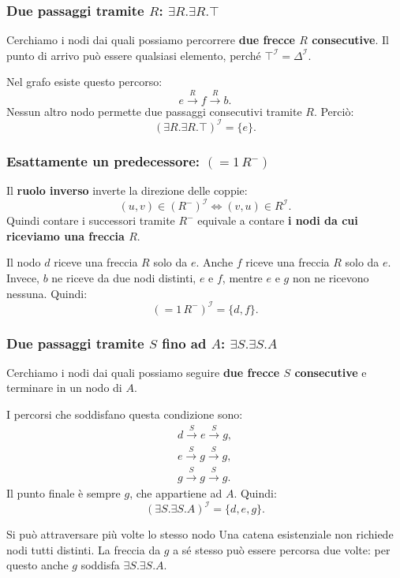 \subsubsection{Due passaggi tramite \(R\): \(\exists R.\exists R.\top\)}

Cerchiamo i nodi dai quali possiamo percorrere \textbf{due frecce \(R\)
consecutive}. Il punto di arrivo può essere qualsiasi elemento, perché
\(\top^{\mathcal I}=\Delta^{\mathcal I}\).

Nel grafo esiste questo percorso:
\[
    e\xrightarrow{R}f\xrightarrow{R}b.
\]
Nessun altro nodo permette due passaggi consecutivi tramite \(R\). Perciò:
\[
    (\exists R.\exists R.\top)^{\mathcal I}=\{e\}.
\]

\subsubsection{Esattamente un predecessore: \((=1\,R^{-})\)}

Il \textbf{ruolo inverso} inverte la direzione delle coppie:
\[
    (u,v)\in(R^{-})^{\mathcal I}\iff(v,u)\in R^{\mathcal I}.
\]
Quindi contare i successori tramite \(R^{-}\) equivale a contare
\textbf{i nodi da cui riceviamo una freccia \(R\)}.

Il nodo \(d\) riceve una freccia \(R\) solo da \(e\). Anche \(f\) riceve
una freccia \(R\) solo da \(e\). Invece, \(b\) ne riceve da due nodi
distinti, \(e\) e \(f\), mentre \(e\) e \(g\) non ne ricevono nessuna.
Quindi:
\[
    (=1\,R^{-})^{\mathcal I}=\{d,f\}.
\]

\subsubsection{Due passaggi tramite \(S\) fino ad \(A\): \(\exists S.\exists S.A\)}

Cerchiamo i nodi dai quali possiamo seguire \textbf{due frecce \(S\)
consecutive} e terminare in un nodo di \(A\).

I percorsi che soddisfano questa condizione sono:
\begin{gather*}
    d\xrightarrow{S}e\xrightarrow{S}g,\\
    e\xrightarrow{S}g\xrightarrow{S}g,\\
    g\xrightarrow{S}g\xrightarrow{S}g.
\end{gather*}
Il punto finale è sempre \(g\), che appartiene ad \(A\). Quindi:
\[
    (\exists S.\exists S.A)^{\mathcal I}=\{d,e,g\}.
\]

\begin{observation}{Si può attraversare più volte lo stesso nodo}
    Una catena esistenziale non richiede nodi tutti distinti. La freccia
    da \(g\) a sé stesso può essere percorsa due volte: per questo anche
    \(g\) soddisfa \(\exists S.\exists S.A\).
\end{observation}

